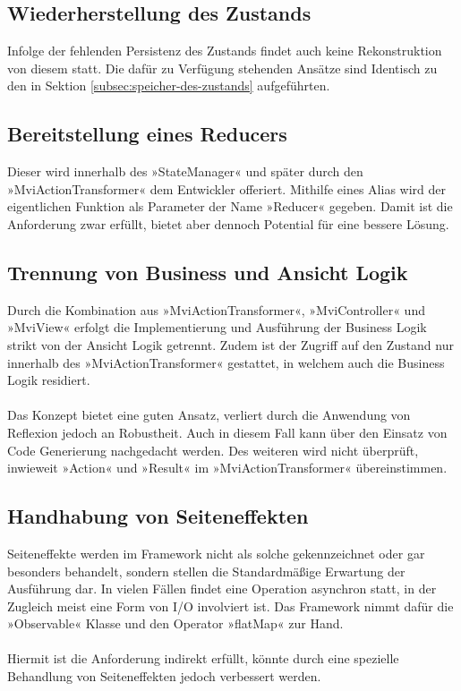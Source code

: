 \subsection{Wiederherstellung des Zustands}
Infolge der fehlenden Persistenz des Zustands findet auch keine Rekonstruktion von diesem statt. Die dafür zu Verfügung stehenden Ansätze sind Identisch zu den in Sektion
\ref{subsec:speicher-des-zustands}
aufgeführten.

\subsection{Bereitstellung eines Reducers}
Dieser wird innerhalb des »StateManager« und später durch den »MviActionTransformer« dem Entwickler offeriert. Mithilfe eines Alias wird der eigentlichen Funktion als Parameter der Name »Reducer« gegeben.
Damit ist die Anforderung zwar erfüllt, bietet aber dennoch Potential für eine bessere Lösung.


\subsection{Trennung von Business und Ansicht Logik}
Durch die Kombination aus »MviActionTransformer«, »MviController« und »MviView« erfolgt die Implementierung und Ausführung der Business Logik strikt von der Ansicht Logik getrennt. Zudem ist der Zugriff auf den Zustand nur innerhalb des »MviActionTransformer« gestattet, in welchem auch die Business Logik residiert. 
\\\\
Das Konzept bietet eine guten Ansatz, verliert durch die Anwendung von Reflexion jedoch an Robustheit. Auch in diesem Fall kann über den Einsatz von Code Generierung nachgedacht werden. Des weiteren wird nicht überprüft, inwieweit »Action« und »Result« im »MviActionTransformer« übereinstimmen.

\subsection{Handhabung von Seiteneffekten}
Seiteneffekte werden im Framework nicht als solche gekennzeichnet oder gar besonders behandelt, sondern stellen die Standardmäßige Erwartung der Ausführung dar. In vielen Fällen findet eine Operation asynchron statt, in der Zugleich meist eine Form von I/O involviert ist. Das Framework nimmt dafür die »Observable« Klasse und den Operator »flatMap« zur Hand.
\\\\
Hiermit ist die Anforderung indirekt erfüllt, könnte durch eine spezielle Behandlung von Seiteneffekten jedoch verbessert werden.

